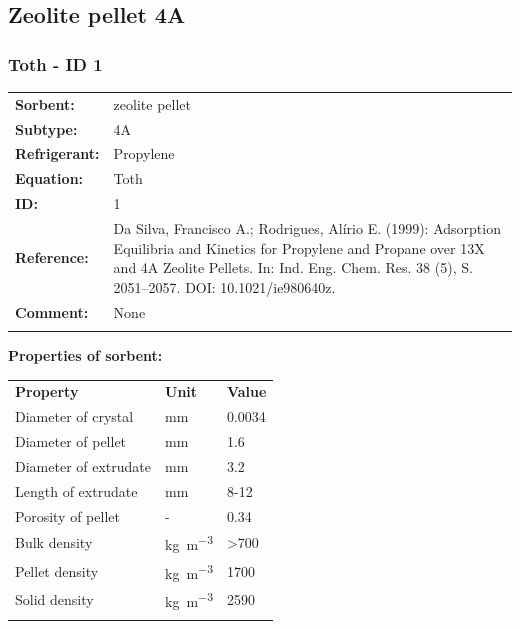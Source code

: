 \subsection{Zeolite pellet 4A}
%
\subsubsection{Toth - ID 1}
%
\begin{tabular}[l]{|lp{11.5cm}|}
\hline
\addlinespace

\textbf{Sorbent:} & zeolite pellet \\
\textbf{Subtype:} & 4A \\
\textbf{Refrigerant:} & Propylene \\
\textbf{Equation:} & Toth \\
\textbf{ID:} & 1 \\
\textbf{Reference:} & Da Silva, Francisco A.; Rodrigues, Alírio E. (1999): Adsorption Equilibria and Kinetics for Propylene and Propane over 13X and 4A Zeolite Pellets. In: Ind. Eng. Chem. Res. 38 (5), S. 2051–2057. DOI: 10.1021/ie980640z. \\
\textbf{Comment:} & None \\

\addlinespace
\hline
\end{tabular}
\newline

\textbf{Properties of sorbent:}
\newline
%
\begin{longtable}[l]{lll}
\toprule
\addlinespace
\textbf{Property} & \textbf{Unit} & \textbf{Value} \\
\addlinespace
\midrule
\endhead
\bottomrule
\endfoot
\bottomrule
\endlastfoot
\addlinespace

Diameter of crystal & \si{\milli\meter} & 0.0034\\
Diameter of pellet & \si{\milli\meter} & 1.6\\
Diameter of extrudate & \si{\milli\meter} & 3.2\\
Length of extrudate & \si{\milli\meter} & 8-12\\
Porosity of pellet & - & 0.34\\
Bulk density & \si{\kilogram\per\cubic\meter} & >700\\
Pellet density & \si{\kilogram\per\cubic\meter} & 1700\\
Solid density & \si{\kilogram\per\cubic\meter} & 2590\\

\addlinespace\end{longtable}

